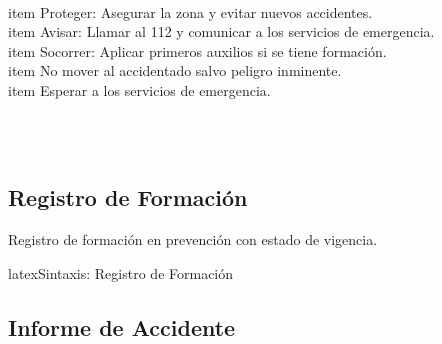 \begin{emergencyprocedure}
  \begin{enumerate}
  \\item Proteger: Asegurar la zona y evitar nuevos accidentes.
  \\item Avisar: Llamar al 112 y comunicar a los servicios de emergencia.
  \\item Socorrer: Aplicar primeros auxilios si se tiene formación.
  \\item No mover al accidentado salvo peligro inminente.
  \\item Esperar a los servicios de emergencia.
\end{enumerate}

  \vspace{0.5em}
  \\
  \\
\end{emergencyprocedure}

\subsection{Registro de Formación}
\label{subsec:formacion}

Registro de formación en prevención con estado de vigencia.

\begin{codigosimple}{latex}{Sintaxis: Registro de Formación}
\begin{trainingrecord}
\end{trainingrecord}
\end{codigosimple}

\begin{trainingrecord}
\end{trainingrecord}

\subsection{Informe de Accidente}
\label{subsec:accidente}

